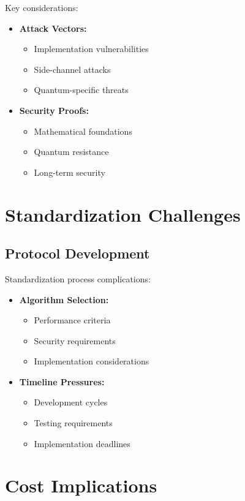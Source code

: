 Key considerations:
\begin{itemize}
    \item \textbf{Attack Vectors:}
    \begin{itemize}
        \item Implementation vulnerabilities
        \item Side-channel attacks
        \item Quantum-specific threats
    \end{itemize}
    \item \textbf{Security Proofs:}
    \begin{itemize}
        \item Mathematical foundations
        \item Quantum resistance
        \item Long-term security
    \end{itemize}
\end{itemize}

\section{Standardization Challenges}\label{sec:standardization}

\subsection{Protocol Development}\label{subsec:protocols}
Standardization process complications:

\begin{itemize}
    \item \textbf{Algorithm Selection:}
    \begin{itemize}
        \item Performance criteria
        \item Security requirements
        \item Implementation considerations
    \end{itemize}
    \item \textbf{Timeline Pressures:}
    \begin{itemize}
        \item Development cycles
        \item Testing requirements
        \item Implementation deadlines
    \end{itemize}
\end{itemize}

\section{Cost Implications}\label{sec:costs}

